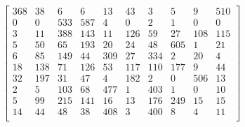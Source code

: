 \documentclass[french,a4paper,18pt]{article}
\begin{document}
\[
\begin{bmatrix}
368 & 38 & 6 & 6 & 13 & 43 & 3 & 5 & 9 & 510 \\
0 & 0 & 533 & 587 & 4 & 0 & 2 & 1 & 0 & 0 \\
3 & 11 & 388 & 143 & 11 & 126 & 59 & 27 & 108 & 115 \\
5 & 50 & 65 & 193 & 20 & 24 & 48 & 605 & 1 & 21 \\
6 & 85 & 149 & 44 & 309 & 27 & 334 & 2 & 20 & 4 \\
18 & 138 & 71 & 126 & 53 & 117 & 110 & 177 & 9 & 44 \\
32 & 197 & 31 & 47 & 4 & 182 & 2 & 0 & 506 & 13 \\
2 & 5 & 103 & 68 & 477 & 1 & 403 & 1 & 0 & 10 \\
5 & 99 & 215 & 141 & 16 & 13 & 176 & 249 & 15 & 15 \\
14 & 44 & 48 & 38 & 408 & 3 & 400 & 8 & 4 & 11 \\
\end{bmatrix}
\]
\end{document}
